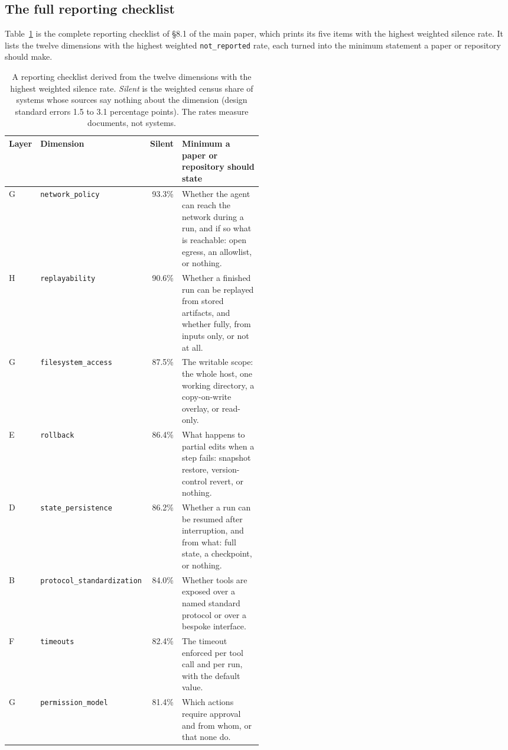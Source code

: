 \subsection{The full reporting checklist}
\label{subsec:moved-checklist}

Table~\ref{tab:checklist-full} is the complete reporting checklist of \S8.1 of the main paper, which
prints its five items with the highest weighted silence rate. It lists the twelve dimensions with the
highest weighted \texttt{not\_reported} rate, each turned into the minimum statement a paper or
repository should make.

\begin{table}[htbp]
\caption{A reporting checklist derived from the twelve dimensions with the highest weighted silence rate.
\emph{Silent} is the weighted census share of systems whose sources say nothing about the dimension
(design standard errors 1.5 to 3.1 percentage points). The rates measure documents, not systems.}
\label{tab:checklist-full}
\small
\begin{tabular}{llrp{0.50\linewidth}}
\toprule
Layer & Dimension & Silent & Minimum a paper or repository should state \\
\midrule
G & \texttt{network\_policy} & 93.3\% & Whether the agent can reach the network during a run, and if so what is reachable: open egress, an allowlist, or nothing. \\
H & \texttt{replayability} & 90.6\% & Whether a finished run can be replayed from stored artifacts, and whether fully, from inputs only, or not at all. \\
G & \texttt{filesystem\_access} & 87.5\% & The writable scope: the whole host, one working directory, a copy-on-write overlay, or read-only. \\
E & \texttt{rollback} & 86.4\% & What happens to partial edits when a step fails: snapshot restore, version-control revert, or nothing. \\
D & \texttt{state\_persistence} & 86.2\% & Whether a run can be resumed after interruption, and from what: full state, a checkpoint, or nothing. \\
B & \texttt{protocol\_standardization} & 84.0\% & Whether tools are exposed over a named standard protocol or over a bespoke interface. \\
F & \texttt{timeouts} & 82.4\% & The timeout enforced per tool call and per run, with the default value. \\
G & \texttt{permission\_model} & 81.4\% & Which actions require approval and from whom, or that none do. \\

\end{tabular}
\end{table}
